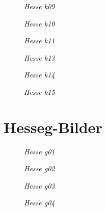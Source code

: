 \documentclass[12pt,a4paper,twosides,ngerman]{scrbook}
\begin{document}
\begin{figure}[htbp]
\epsfysize=3.0in
\centerline{}
\caption{\em Hesse k09}\label{fig1}
\end{figure}

\begin{figure}[htbp]
\epsfysize=3.0in
\centerline{}
\caption{\em Hesse k10}\label{fig1}
\end{figure}

\begin{figure}[htbp]
\epsfysize=3.0in
\centerline{}
\caption{\em Hesse k11}\label{fig1}
\end{figure} 
 
\begin{figure}[htbp]
\epsfysize=3.0in
\centerline{}
\caption{\em Hesse k13}\label{fig1}
\end{figure}

\begin{figure}[htbp]
\epsfysize=3.0in
\centerline{}
\caption{\em Hesse k14}\label{fig1}
\end{figure}

\begin{figure}[htbp]
\epsfysize=3.0in
\centerline{}
\caption{\em Hesse k15}\label{fig1}
\end{figure}

 
 

 
 
 
\section{Hesseg-Bilder}

\begin{figure}[htbp]
\epsfysize=3.0in
\centerline{}
\caption{\em Hesse g01}\label{fig1}
\end{figure}

\begin{figure}[htbp]
\epsfysize=3.0in
\centerline{}
\caption{\em Hesse g02}\label{fig1}
\end{figure}

\begin{figure}[htbp]
\epsfysize=3.0in
\centerline{}
\caption{\em Hesse g03}\label{fig1}
\end{figure}

\begin{figure}[htbp]
\epsfysize=3.0in
\centerline{}
\caption{\em Hesse g04}\label{fig1}
\end{figure}
\end{document}
